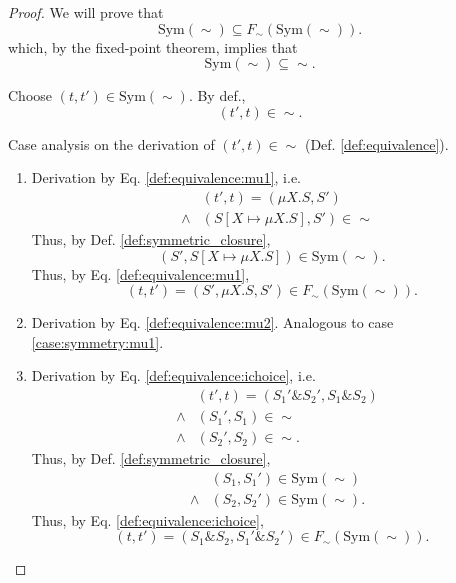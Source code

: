 \documentclass{llncs}
\newcommand*{\Sym}{\mathrm{Sym}}
\newcommand*{\sequiv}{\sim}
\newcommand*{\ichoice}{\mathop{\&}}
\renewcommand*{\|}{\;|\;}
\begin{document}
\begin{proof}
  We will prove that
  \begin{equation*}
    \Sym(\sequiv) \subseteq F_\sequiv(\Sym(\sequiv)).
  \end{equation*}
  which, by the fixed-point theorem, implies that
  \begin{equation*}
    \Sym(\sequiv) \subseteq \sequiv.
  \end{equation*}

  Choose $(t, t') \in \Sym(\sequiv)$. By def.,
  \begin{equation*}
    (t', t) \in \sequiv.
  \end{equation*}

  Case analysis on the derivation of $(t', t) \in \sequiv$
  (Def. \ref{def:equivalence}).

  \begin{enumerate}
    \item
      \label{case:symmetry:mu1}
      Derivation by Eq. \ref{def:equivalence:mu1}, i.e.
      \begin{eqnarray*}
        &&      (t', t) = (\mu X.S, S') \\
        &\land& (S[X \mapsto \mu X.S], S') \in \sequiv
      \end{eqnarray*}
      Thus, by Def. \ref{def:symmetric_closure},
      \begin{equation*}
        (S', S[X \mapsto \mu X.S]) \in \Sym(\sequiv).
      \end{equation*}
      Thus, by Eq. \ref{def:equivalence:mu1},
      \begin{equation*}
        (t, t') = (S', \mu X.S, S') \in F_\sequiv(\Sym(\sequiv)).
      \end{equation*}

    \item
      \label{case:symmetry:mu2}
      Derivation by Eq. \ref{def:equivalence:mu2}. Analogous to case
      \ref{case:symmetry:mu1}.

    \item
      \label{case:symmetry:ichoice}
      Derivation by Eq. \ref{def:equivalence:ichoice}, i.e.
      \begin{eqnarray*}
        && (t', t) = (S_1' \ichoice S_2', S_1 \ichoice S_2) \\
        &\land& (S_1', S_1) \in \sequiv \\
        &\land& (S_2', S_2) \in \sequiv.
      \end{eqnarray*}
      Thus, by Def. \ref{def:symmetric_closure},
      \begin{eqnarray*}
        &&      (S_1, S_1') \in \Sym(\sequiv) \\
        &\land& (S_2, S_2') \in \Sym(\sequiv).
      \end{eqnarray*}
      Thus, by Eq. \ref{def:equivalence:ichoice},
      \begin{equation*}
        (t, t') = (S_1 \ichoice S_2, S_1' \ichoice S_2') \in F_\sequiv(\Sym(\sequiv)).
      \end{equation*}


\end{enumerate}
\end{proof}
\end{document}
